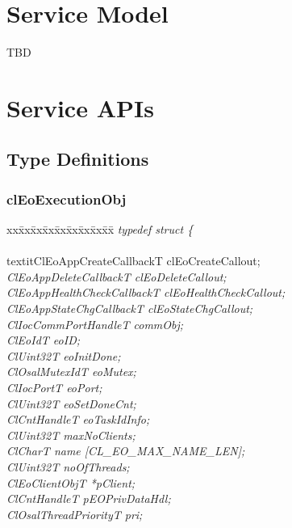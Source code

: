 \begin{flushleft}
\chapter{Service Model}
TBD

\chapter{Service APIs}

\section{Type Definitions}

\subsection{clEoExecutionObj}
\begin{tabbing}
xx\=xx\=xx\=xx\=xx\=xx\=xx\=xx\=xx\=\kill
\textit{typedef struct \{}\\
\>\>\>\\textit{ClEoAppCreateCallbackT clEoCreateCallout;}\\
\>\>\>\>\textit{ClEoAppDeleteCallbackT clEoDeleteCallout;}\\
\>\>\>\>\textit{ClEoAppHealthCheckCallbackT clEoHealthCheckCallout;}\\
\>\>\>\>\textit{ClEoAppStateChgCallbackT clEoStateChgCallout;}\\
\>\>\>\>\textit{ClIocCommPortHandleT commObj;}\\
\>\>\>\>\textit{ClEoIdT eoID;}\\
\>\>\>\>\textit{ClUint32T eoInitDone;}\\
\>\>\>\>\textit{ClOsalMutexIdT eoMutex;}\\
\>\>\>\>\textit{ClIocPortT eoPort;}\\
\>\>\>\>\textit{ClUint32T eoSetDoneCnt;}\\
\>\>\>\>\textit{ClCntHandleT eoTaskIdInfo;}\\
\>\>\>\>\textit{ClUint32T maxNoClients;}\\
\>\>\>\>\textit{ClCharT name \mbox{[}CL\_EO\_MAX\_NAME\_LEN\mbox{]};}\\
\>\>\>\>\textit{ClUint32T noOfThreads;}\\
\>\>\>\>\textit{ClEoClientObjT *pClient;}\\
\>\>\>\>\textit{ClCntHandleT pEOPrivDataHdl;}\\
\>\>\>\>\textit{ClOsalThreadPriorityT pri;}\\

\end{tabbing}
\end{flushleft}
